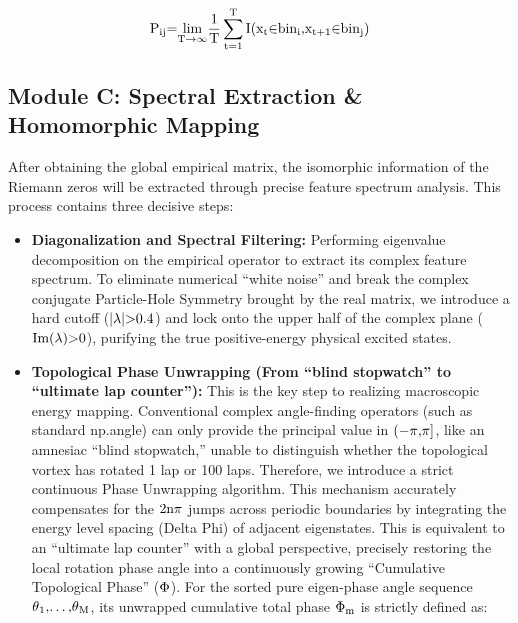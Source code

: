 \documentclass[fleqn,10pt]{wlscirep}
\begin{document}
\[\text{P}_{\text{ij}}\text{=}\underset{\text{T}\text{\ensuremath{\rightarrow}\ensuremath{\infty}}}{\text{lim}}\frac{\text{1}}{\text{T}}\sum_{\text{t}\text{=1}}^{\text{T}}\text{I}\text{(}\text{x}_{\text{t}}\text{\ensuremath{\in}}\text{bin}_{\text{i}}\text{,}\text{x}_{\text{t}\text{+1}}\text{\ensuremath{\in}}\text{bin}_{\text{j}}\text{)}\]

\subsection*{Module C: Spectral Extraction \& Homomorphic Mapping}

After obtaining the global empirical matrix, the isomorphic information
of the Riemann zeros will be extracted through precise feature spectrum
analysis. This process contains three decisive steps:

\begin{itemize}
\item
  \textbf{Diagonalization and Spectral Filtering:} Performing eigenvalue
  decomposition on the empirical operator to extract its complex feature
  spectrum. To eliminate numerical ``white noise'' and break the complex
  conjugate Particle-Hole Symmetry brought by the real matrix, we
  introduce a hard cutoff (\(\text{|}\text{\ensuremath{\lambda}}\text{|>0.4}\)) and lock
  onto the upper half of the complex plane
  (\(\text{Im(}\text{\ensuremath{\lambda}}\text{)>0}\)), purifying the true positive-energy
  physical excited states.
\item
  \textbf{Topological Phase Unwrapping (From ``blind stopwatch'' to
  ``ultimate lap counter''):} This is the key step to realizing
  macroscopic energy mapping. Conventional complex angle-finding
  operators (such as standard np.angle) can only provide the principal
  value in \(\text{(\ensuremath{-}}\text{\ensuremath{\pi}}\text{,}\text{\ensuremath{\pi}}\text{]}\), like an
  amnesiac ``blind stopwatch,'' unable to distinguish whether the
  topological vortex has rotated 1 lap or 100 laps. Therefore, we
  introduce a strict continuous Phase Unwrapping algorithm. This
  mechanism accurately compensates for the \(\text{2}\text{n\ensuremath{\pi}}\) jumps
  across periodic boundaries by integrating the energy level spacing
  (Delta Phi) of adjacent eigenstates. This is equivalent to an
  ``ultimate lap counter'' with a global perspective, precisely
  restoring the local rotation phase angle into a continuously growing
  ``Cumulative Topological Phase'' (\(\text{\ensuremath{\Phi}}\)). For the sorted pure
  eigen-phase angle sequence
  \(\text{\ensuremath{\theta}}_{\text{1}}\text{,\ldots{},}\text{\ensuremath{\theta}}_{\text{M}}\), its unwrapped
  cumulative total phase \(\text{\ensuremath{\Phi}}_{\text{m}}\) is strictly defined as:
\end{itemize}
\end{document}
